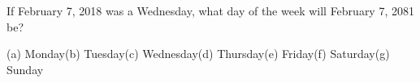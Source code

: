 If February 7, 2018 was a Wednesday, what day of the week will February 7, 2081 be?

(a) Monday\quad (b) Tuesday\quad (c) Wednesday\quad (d) Thursday\quad (e) Friday\quad (f) Saturday\quad (g) Sunday
